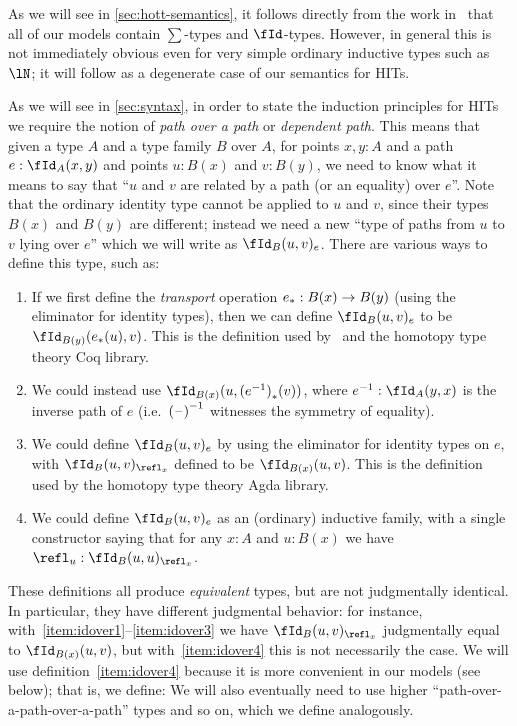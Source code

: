 \documentclass{amsart}
\begin{document}
As we will see in \cref{sec:hott-semantics}, it follows directly from the work in~\cite{lw:localuniv} that all of our models contain $\sum$-types and $\fId$-types.
However, in general this is not immediately obvious even for very simple ordinary inductive types such as $\lN$; it will follow as a degenerate case of our semantics for HITs.

As we will see in \cref{sec:syntax}, in order to state the induction principles for HITs we require the notion of \emph{path over a path} or \emph{dependent path}.
This means that given a type $A$ and a type family $B$ over $A$, for points $x,y:A$ and a path $e:\id[A]xy$ and points $u:B(x)$ and $v:B(y)$, we need to know what it means to say that ``$u$ and $v$ are related by a path (or an equality) over $e$''.
Note that the ordinary identity type cannot be applied to $u$ and $v$, since their types $B(x)$ and $B(y)$ are different; instead we need a new ``type of paths from $u$ to $v$ lying over $e$'' which we will write as $\idover[B]{u}{v}{e}$.
There are various ways to define this type, such as:
\begin{enumerate}
\item If we first define the \emph{transport} operation ${e}_{*}:B(x) \to B(y)$ (using the eliminator for identity types), then we can define $\idover[B]{u}{v}{e}$ to be $\id[B(y)]{\transf{e}(u)}{v}$.
  This is the definition used by~\cite{hottbook} and the homotopy type theory Coq library.\label{item:idover1}
\item We could instead use $\id[B(x)]{u}{\transf{(\opp{e})}(v)}$, where $\opp{e}:\id[A]{y}{x}$ is the inverse path of $e$ (i.e.\ $\mathord{{(\mathord{\hspace{1pt}\text{--}\hspace{1pt}})}^{-1}}$ witnesses the symmetry of equality).\label{item:idover2}
\item We could define $\idover[B]{u}{v}{e}$ by using the eliminator for identity types on $e$, with $\idover[B]{u}{v}{\refl_x}$ defined to be $\id[B(x)]{u}{v}$.
  This is the definition used by the homotopy type theory Agda library.\label{item:idover3}
\item We could define $\idover[B]{u}{v}{e}$ as an (ordinary) inductive family, with a single constructor saying that for any $x:A$ and $u:B(x)$ we have $\refl_u : \idover[B]{u}{u}{\refl_x}$.\label{item:idover4}
\end{enumerate}
These definitions all produce \emph{equivalent} types, but are not judgmentally identical.
In particular, they have different judgmental behavior: for instance, with~\ref{item:idover1}--\ref{item:idover3} we have $\idover[B]{u}{v}{\refl_x}$ judgmentally equal to $\id[B(x)]{u}{v}$, but with~\ref{item:idover4} this is not necessarily the case.
We will use definition~\ref{item:idover4} because it is more convenient in our models (see below); that is, we define:
We will also eventually need to use higher ``path-over-a-path-over-a-path'' types and so on, which we define analogously.
\end{document}
